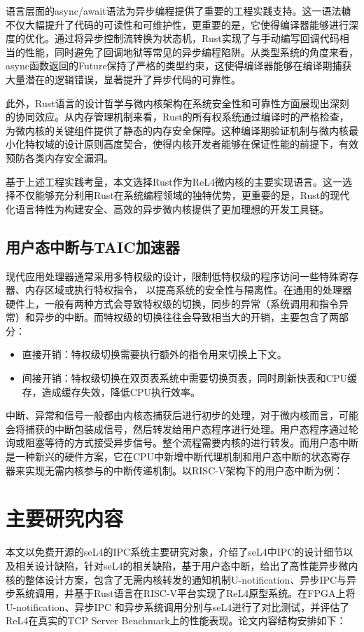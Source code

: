 语言层面的async/await语法为异步编程提供了重要的工程实践支持。这一语法糖不仅大幅提升了代码的可读性和可维护性，更重要的是，它使得编译器能够进行深度的优化。通过将异步控制流转换为状态机，Rust实现了与手动编写回调代码相当的性能，同时避免了回调地狱等常见的异步编程陷阱。从类型系统的角度来看，async函数返回的Future保持了严格的类型约束，这使得编译器能够在编译期捕获大量潜在的逻辑错误，显著提升了异步代码的可靠性。

此外，Rust语言的设计哲学与微内核架构在系统安全性和可靠性方面展现出深刻的协同效应。从内存管理机制来看，Rust的所有权系统通过编译时的严格检查，为微内核的关键组件提供了静态的内存安全保障。这种编译期验证机制与微内核最小化特权域的设计原则高度契合，使得内核开发者能够在保证性能的前提下，有效预防各类内存安全漏洞。

基于上述工程实践考量，本文选择Rust作为ReL4微内核的主要实现语言。这一选择不仅能够充分利用Rust在系统编程领域的独特优势，更重要的是，Rust的现代化语言特性为构建安全、高效的异步微内核提供了更加理想的开发工具链。

\subsection{用户态中断与TAIC加速器}
现代应用处理器通常采用多特权级的设计，限制低特权级的程序访问一些特殊寄存器、内存区域或执行特权指令， 以提高系统的安全性与隔离性。在通用的处理器硬件上，一般有两种方式会导致特权级的切换，同步的异常（系统调用和指令异常）和异步的中断。而特权级的切换往往会导致相当大的开销，主要包含了两部分：
\begin{itemize}
    \item 直接开销：特权级切换需要执行额外的指令用来切换上下文。
    \item 间接开销：特权级切换在双页表系统中需要切换页表，同时刷新快表和CPU缓存，造成缓存失效，降低CPU执行效率。
\end{itemize}

中断、异常和信号一般都由内核态捕获后进行初步的处理，对于微内核而言，可能会将捕获的中断包装成信号，然后转发给用户态程序进行处理。用户态程序通过轮询或阻塞等待的方式接受异步信号。整个流程需要内核的进行转发。而用户态中断是一种新兴的硬件方案，它在CPU中新增中断代理机制和用户态中断的状态寄存器来实现无需内核参与的中断传递机制。以RISC-V架构下的用户态中断为例：


\section{主要研究内容}
本文以免费开源的seL4的IPC系统主要研究对象，介绍了seL4中IPC的设计细节以及相关设计缺陷，针对seL4的相关缺陷，基于用户态中断，给出了高性能异步微内核的整体设计方案，包含了无需内核转发的通知机制U-notification、异步IPC与异步系统调用，并基于Rust语言在RISC-V平台实现了ReL4原型系统。在FPGA上将U-notification、异步IPC 和异步系统调用分别与seL4进行了对比测试，并评估了ReL4在真实的TCP Server Benchmark上的性能表现。论文内容结构安排如下：

